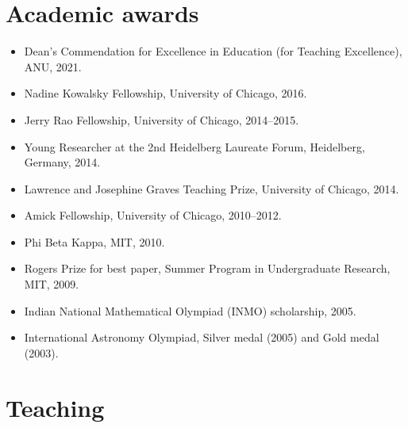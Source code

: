 \documentclass[a4paper]{moderncv}
\begin{document}
\section{Academic awards}
\label{sec:orgde5c642}
\begin{itemize}
\item Dean's Commendation for Excellence in Education (for Teaching Excellence), ANU, 2021.
\item Nadine Kowalsky Fellowship, University of Chicago, 2016.
\item Jerry Rao Fellowship, University of Chicago, 2014--2015.
\item Young Researcher at the 2nd Heidelberg Laureate Forum, Heidelberg, Germany, 2014.
\item Lawrence and Josephine Graves Teaching Prize, University of Chicago, 2014.
\item Amick Fellowship, University of Chicago, 2010--2012.
\item Phi Beta Kappa, MIT, 2010.
\item Rogers Prize for best paper, Summer Program in Undergraduate Research, MIT, 2009.
\item Indian National Mathematical Olympiad (INMO) scholarship, 2005.
\item International Astronomy Olympiad, Silver medal (2005) and Gold medal (2003).
\end{itemize}

\section{Teaching}
\label{sec:org0bbdf53}
\end{document}
